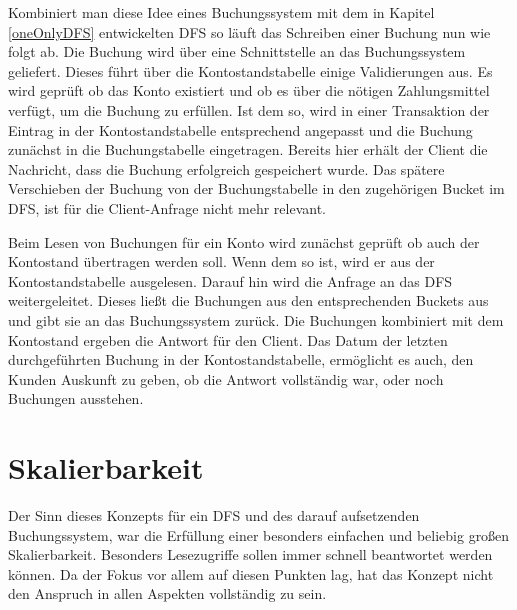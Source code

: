 \documentclass[12pt,oneside,a4paper,parskip]{scrbook}
\begin{document}
Kombiniert man diese Idee eines Buchungssystem mit dem in Kapitel \ref{oneOnlyDFS} entwickelten DFS so läuft das Schreiben einer Buchung nun wie folgt ab. Die Buchung wird über eine Schnittstelle an das Buchungssystem geliefert. Dieses führt über die Kontostandstabelle einige Validierungen aus. Es wird geprüft ob das Konto existiert und ob es über die nötigen Zahlungsmittel verfügt, um die Buchung zu erfüllen. Ist dem so, wird in einer Transaktion der Eintrag in der Kontostandstabelle entsprechend angepasst und die Buchung zunächst in die Buchungstabelle eingetragen. Bereits hier erhält der Client die Nachricht, dass die Buchung erfolgreich gespeichert wurde. Das spätere Verschieben der Buchung von der Buchungstabelle in den zugehörigen Bucket im DFS, ist für die Client-Anfrage nicht mehr relevant.

Beim Lesen von Buchungen für ein Konto wird zunächst geprüft ob auch der Kontostand übertragen werden soll. Wenn dem so ist, wird er aus der Kontostandstabelle ausgelesen. Darauf hin wird die Anfrage an das DFS weitergeleitet. Dieses ließt die Buchungen aus den entsprechenden Buckets aus und gibt sie an das Buchungssystem zurück. Die Buchungen kombiniert mit dem Kontostand ergeben die Antwort für den Client. Das Datum der letzten durchgeführten Buchung in der Kontostandstabelle, ermöglicht es auch, den Kunden Auskunft zu geben, ob die Antwort vollständig war, oder noch Buchungen ausstehen.

\section{Skalierbarkeit}
Der Sinn dieses Konzepts für ein DFS und des darauf aufsetzenden Buchungssystem, war die Erfüllung einer besonders einfachen und beliebig großen Skalierbarkeit. Besonders Lesezugriffe sollen immer schnell beantwortet werden können. Da der Fokus vor allem auf diesen Punkten lag, hat das Konzept nicht den Anspruch in allen Aspekten vollständig zu sein. 
\end{document}
